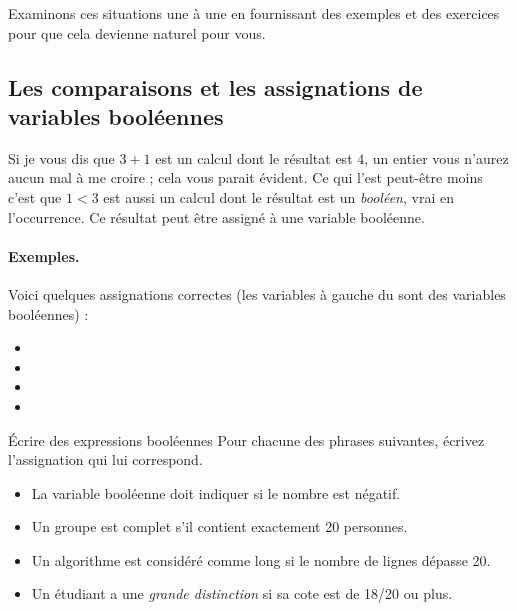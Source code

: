 		Examinons ces situations une à une
		en fournissant des exemples et des exercices
		pour que cela devienne naturel pour vous.
		
		\subsection{Les comparaisons et les assignations de variables booléennes}
		
			Si je vous dis que $3+1$ est un calcul
			dont le résultat est $4$, un entier
			vous n'aurez aucun mal à me croire ; 
			cela vous parait évident.
			Ce qui l'est peut-être moins c'est que $1<3$ est aussi
			un calcul dont le résultat est un \emph{booléen},
			vrai en l’occurrence. 
			Ce résultat peut être assigné à une variable booléenne.			

			\paragraph{Exemples.}
			Voici quelques assignations correctes 
			(les variables à gauche du \Gets sont des variables booléennes) :
			\begin{itemize}
				\item {} 
				\item {}
				\item {}
				\item {}
			\end{itemize}
		
			\begin{Exercice}{Écrire des expressions booléennes}
				Pour chacune des phrases suivantes,
				écrivez l'assignation qui lui correspond.
				\begin{itemize}
				\item 
					La variable booléenne 
					doit indiquer si le nombre  est négatif.
				\item
					Un groupe est complet s'il contient exactement 20 personnes.
				\item
					Un algorithme est considéré comme long si le nombre de lignes
					dépasse 20.
				\item 
					Un étudiant a une \emph{grande distinction} si sa cote est
					de 18/20 ou plus.
				\end{itemize}
			\end{Exercice}

